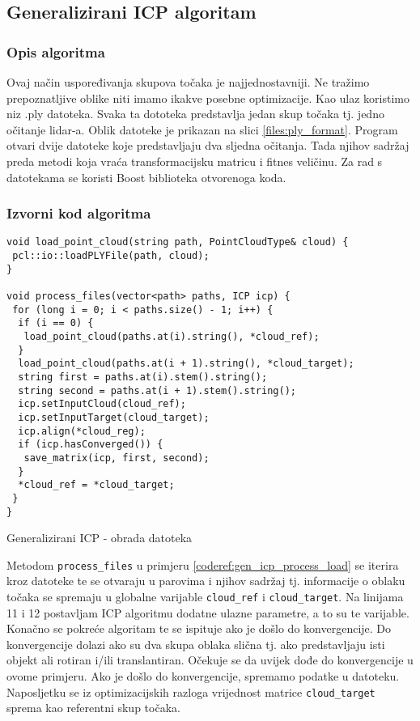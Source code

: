 \subsection{Generalizirani ICP algoritam}

\subsubsection{Opis algoritma}
Ovaj način uspoređivanja skupova točaka je najjednostavniji. Ne tražimo prepoznatljive oblike niti imamo ikakve posebne optimizacije. Kao ulaz koristimo niz .ply datoteka. Svaka ta dototeka predstavlja jedan skup točaka tj. jedno očitanje lidar-a. Oblik datoteke je prikazan na slici \ref{files:ply_format}. Program otvari dvije datoteke koje predstavljaju dva sljedna očitanja. Tada njihov sadržaj preda metodi koja vraća transformacijsku matricu i fitnes veličinu. Za rad s datotekama se koristi Boost biblioteka otvorenoga koda.


\subsubsection{Izvorni kod algoritma}

\begin{listing}[h!]
  \begin{verbatim}
void load_point_cloud(string path, PointCloudType& cloud) {
 pcl::io::loadPLYFile(path, cloud);
}

void process_files(vector<path> paths, ICP icp) {
 for (long i = 0; i < paths.size() - 1; i++) {
  if (i == 0) {
   load_point_cloud(paths.at(i).string(), *cloud_ref);
  }
  load_point_cloud(paths.at(i + 1).string(), *cloud_target);
  string first = paths.at(i).stem().string();
  string second = paths.at(i + 1).stem().string();
  icp.setInputCloud(cloud_ref);
  icp.setInputTarget(cloud_target);
  icp.align(*cloud_reg);
  if (icp.hasConverged()) {
   save_matrix(icp, first, second);
  }
  *cloud_ref = *cloud_target;
 }
}
  \end{verbatim}
  \caption{Generalizirani ICP - obrada datoteka}
  \label{coderef:gen_icp_process_load}
\end{listing}

Metodom \texttt{process_files} u primjeru \ref{coderef:gen_icp_process_load} se iterira kroz datoteke te se otvaraju u parovima i njihov sadržaj tj. informacije o oblaku točaka se spremaju u globalne varijable \texttt{cloud_ref} i \texttt{cloud_target}. Na linijama 11 i 12 postavljam ICP algoritmu dodatne ulazne parametre, a to su te varijable. Konačno se pokreće algoritam te se ispituje ako je došlo do konvergencije. Do konvergencije dolazi ako su dva skupa oblaka slična tj. ako predstavljaju isti objekt ali rotiran i/ili translantiran. Očekuje se da uvijek dođe do konvergencije u ovome primjeru. Ako je došlo do konvergencije, spremamo podatke u datoteku. Naposljetku se iz optimizacijskih razloga vrijednost matrice \texttt{cloud_target} sprema kao referentni skup točaka.

